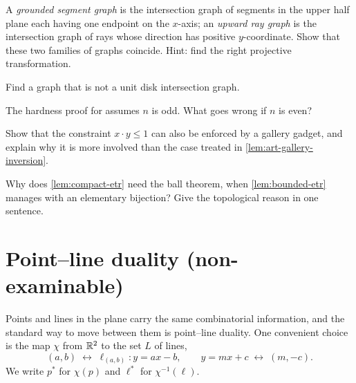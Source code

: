 \begin{exercise}
A \emph{grounded segment graph} is the intersection graph of segments in the
upper half plane each having one endpoint on the $x$-axis; an \emph{upward ray
graph} is the intersection graph of rays whose direction has positive
$y$-coordinate. Show that these two families of graphs coincide. Hint: find the
right projective transformation.
\end{exercise}

\begin{exercise}
Find a graph that is not a unit disk intersection graph.
\end{exercise}

\begin{exercise}
The hardness proof for  assumes $n$ is odd.
What goes wrong if $n$ is even?
\end{exercise}

\begin{exercise}
Show that the constraint $x \cdot y \le 1$ can also be enforced by a gallery
gadget, and explain why it is more involved than the case treated in
\cref{lem:art-gallery-inversion}.
\end{exercise}

\begin{exercise}
Why does \cref{lem:compact-etr} need the ball theorem, when
\cref{lem:bounded-etr} manages with an elementary bijection? Give the
topological reason in one sentence.
\end{exercise}
\section{Point--line duality (non-examinable)}
\label{sec:duality}


Points and lines in the plane carry the same combinatorial information, and the
standard way to move between them is point--line duality. One convenient choice
is the map $\chi$ from $\mathbb{R}^2$ to the set $L$ of lines,
\[ (a,b) \;\longleftrightarrow\; \ell_{(a,b)} : y = ax - b,
   \qquad y = mx + c \;\longleftrightarrow\; (m,-c). \]
We write $p^{*}$ for $\chi(p)$ and $\ell^{*}$ for $\chi^{-1}(\ell)$.

